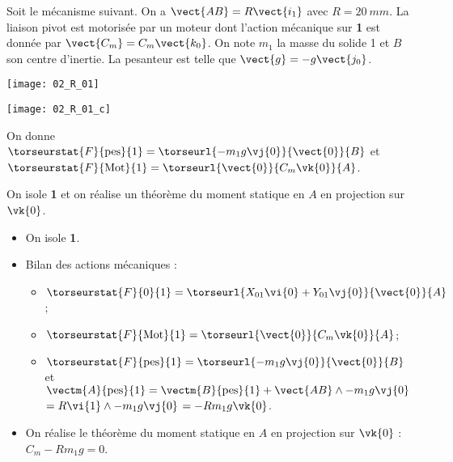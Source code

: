 \normaltrue
\correctiontrue


\setcounter{question}{0}

\ifcorrection
\else
{}
\fi

\ifprof
\else
Soit le mécanisme suivant. On a $\vect{AB}=R\vect{i_1}$ avec $R=\SI{20}{mm}$. La liaison pivot est motorisée par un moteur dont l'action mécanique sur \textbf{1} est donnée par $\vect{C_m}=C_m \vect{k_0}$.
On note $m_1$ la masse du solide 1 et $B$ son centre d'inertie. 
 La pesanteur est telle que $\vect{g}=-g\vect{j_0}$.

\begin{center}
\texttt{[image: 02\_R\_01]}
\end{center}
\fi

\ifprof

\begin{center}
\texttt{[image: 02\_R\_01\_c]}
\end{center}
\else
\fi

\ifprof

\else
On donne 
$\torseurstat{F}{\text{pes}}{1}=\torseurl{-m_1g\vj{0}}{\vect{0}}{B}$ et
$\torseurstat{F}{\text{Mot}}{1}=\torseurl{\vect{0}}{C_m\vk{0}}{A}$.

On isole \textbf{1} et on réalise un théorème du moment statique en $A$ en projection sur $\vk{0}$.
\fi

\ifprof

\begin{itemize}
\item On isole \textbf{1}.
\item Bilan des actions mécaniques : 
\begin{itemize}
\item $\torseurstat{F}{0}{1}=\torseurl{X_{01}\vi{0}+Y_{01}\vj{0}}{\vect{0}}{A}$;
\item $\torseurstat{F}{\text{Mot}}{1}=\torseurl{\vect{0}}{C_m\vk{0}}{A}$;
\item $\torseurstat{F}{\text{pes}}{1}=\torseurl{-m_1g\vj{0}}{\vect{0}}{B}$ et 
$\vectm{A}{\text{pes}}{1} = \vectm{B}{\text{pes}}{1} + \vect{AB}\wedge -m_1g\vj{0}$
$=  R\vi{1}\wedge -m_1g\vj{0}$ $=  -Rm_1g\vk{0}$.
\end{itemize}
\item On réalise le théorème du moment statique en $A$ en projection sur $\vk{0}$ :
$C_m  -Rm_1g = 0$.
\end{itemize}
\else
\fi


